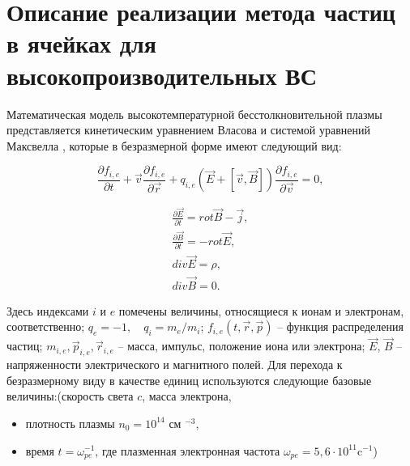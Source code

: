 \chapter{Описание реализации метода частиц в ячейках для высокопроизводительных ВС}
\label{chapt1}

Математическая модель высокотемпературной бесстолкновительной плазмы
представляется кинетическим уравнением Власова и системой
уравнений Максвелла \cite{VshivkovPICbook}, которые в безразмерной форме имеют
следующий вид:

\begin{equation}\label{eq:Vlas}
\frac{\partial f_{i,e}}{\partial t}+{\vec{v}} \frac{\partial f_{i,e}}{\partial \vec{r}}+q_{i,e}({\vec{E}}+[{\vec{v}},{\vec{B}}])\frac{\partial f_{i,e}}{\partial \vec{v}}=0, 
\end{equation}

\begin{eqnarray}
& \frac{\partial \vec{E}}{\partial t}=rot \vec{B} - \vec{j}, & \label{eq:dE}
\\
& \frac{\partial \vec{B}}{\partial t}=-rot \vec{E}, & \label{eq:dB}
\\
& div \vec{E} = \rho, & \label{eq:divE}
\\
& div \vec{B} = 0. & \label{eq:divB}
\end{eqnarray}

Здесь индексами $i$ и $e$ помечены величины, относящиеся к ионам и
электронам, со\-от\-ветст\-вен\-но; $q_e=-1, \quad q_i=m_e/m_i$; $f_{i,e}(t,\vec{r},\vec{p})$ --
функция распределения частиц; $m_{i,e}, \vec{p}_{i,e},
\vec{r}_{i,e}$ -- масса, импульс, положение иона или электрона;
$\vec{E}$, $\vec{B}$ -- напряженности электрического и магнитного
полей. Для перехода к безразмерному виду в качестве единиц
используются следующие базовые величины:(скорость света $c$, масса электрона,
\begin{itemize}
\item плотность плазмы $n_0=10^{14}$ см $^{-3}$,
\item время $t=\omega _{pe}^{-1}$, где плазменная электронная частота $\omega_{pe} =5,6 \cdot 10^{11}$c$^{-1}$)
\end{itemize}

%
%
% 	


